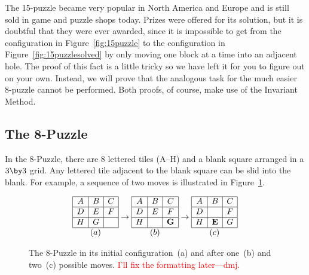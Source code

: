 The 15-puzzle became very popular in North America and Europe and is
still sold in game and puzzle shops today.  Prizes were offered for
its solution, but it is doubtful that they were ever awarded, since it
is impossible to get from the configuration in
Figure~\ref{fig:15puzzle} to the configuration in
Figure~\ref{fig:15puzzlesolved} by only moving one block at a time
into an adjacent hole.  The proof of this fact is a little tricky so
we have left it for you to figure out on your own.  Instead, we will
prove that the analogous task for the much easier 8-puzzle cannot be
performed.  Both proofs, of course, make use of the Invariant Method.

\subsection{The 8-Puzzle}

In the 8-Puzzle, there are 8 lettered tiles (A--H) and a blank square
arranged in a $3 \by 3$ grid.  Any lettered tile adjacent to the blank
square can be slid into the blank.  For example, a sequence of two
moves is illustrated in Figure~\ref{fig:8puzzleA}.

\begin{figure}

\begin{equation*}
\begin{array}{|c|c|c|}
\hline
A & B & C \\ \hline
D & E & F \\ \hline
H & G &   \\ \hline
\multicolumn{3}{c}{(a)}
\end{array}
%
\to
%
\begin{array}{|c|c|c|}
\hline
A & B & C \\ \hline
D & E & F \\ \hline
H &   & \mathbf{G}  \\ \hline
\multicolumn{3}{c}{(b)}
\end{array}
%
\to
%
\begin{array}{|c|c|c|}
\hline
A & B & C \\ \hline
D &   & F \\ \hline
H & \mathbf{E} & G  \\ \hline
\multicolumn{3}{c}{(c)}
\end{array}
\end{equation*}

\caption{The 8-Puzzle in its initial configuration~(a) and after
  one~(b) and two~(c) possible moves.
\textcolor{red}{I'll fix the formatting later---dmj.}}
\label{fig:8puzzleA}
\end{figure}

